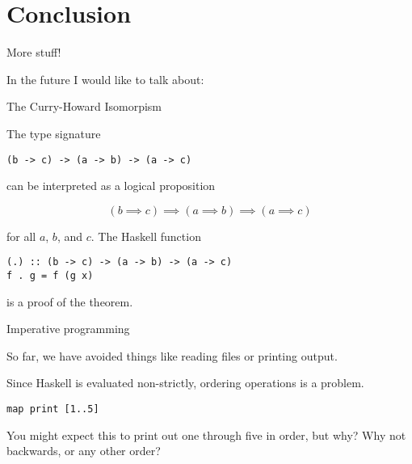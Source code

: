 
\section{Conclusion}

%
\begin{frame}{More stuff!}

In the future I would like to talk about:

\end{frame}

%
\begin{frame}[fragile]{The Curry-Howard Isomorpism}

The type signature

\begin{block}{}
\begin{verbatim}
(b -> c) -> (a -> b) -> (a -> c)
\end{verbatim}
\end{block}

can be interpreted as a logical proposition

\begin{block}{}
\[
(b \implies c) \implies (a \implies b) \implies (a \implies c)
\]
\end{block}

for all $a$, $b$, and $c$. The Haskell function

\begin{block}{}
\begin{verbatim}
(.) :: (b -> c) -> (a -> b) -> (a -> c)
f . g = f (g x)
\end{verbatim}
\end{block}

is a proof of the theorem.

\end{frame}

%
\begin{frame}[fragile]{Imperative programming}

So far, we have avoided things like reading files or printing output.

Since Haskell is evaluated non-strictly, ordering operations is a problem.

\begin{block}{}
\begin{verbatim}
map print [1..5]
\end{verbatim}
\end{block}

You might expect this to print out one through five in order, but why? Why not
backwards, or any other order?

\end{frame}

